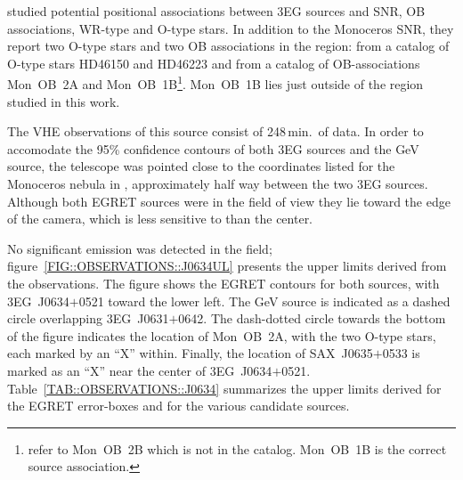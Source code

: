 \citet{REF::ROMERO::AA1999} studied potential positional associations
between 3EG sources and SNR, OB associations, WR-type and O-type
stars.  In addition to the Monoceros SNR, they report two O-type stars
and two OB associations in the region: from a catalog of O-type stars
\citep{REF::CRUZ-GONZALEZ::RMAA1974} HD46150 and HD46223 and
from a catalog of OB-associations \citep{REF::MELNIK::AL1995}
Mon~OB~2A and Mon~OB~1B\footnote{\citet{REF::ROMERO::AA1999} refer to
Mon~OB~2B which is not in the catalog. Mon~OB~1B is the correct source
association.}. Mon~OB~1B lies just outside of the region studied in
this work.

The VHE observations of this source consist of 248\,min.\ of data. In
order to accomodate the 95\% confidence contours of both 3EG sources
and the GeV source, the telescope was pointed close to the coordinates
listed for the Monoceros nebula in \citet{REF::GREEN::WEB2001},
approximately half way between the two 3EG sources. Although both
EGRET sources were in the field of view they lie toward the edge of
the camera, which is less sensitive to \Grays than the center.

No significant emission was detected in the field;
figure~\ref{FIG::OBSERVATIONS::J0634UL} presents the upper limits
derived from the observations. The figure shows the EGRET contours for
both sources, with 3EG~J0634$+$0521 toward the lower left. The GeV
source is indicated as a dashed circle overlapping 3EG~J0631$+$0642.
The dash-dotted circle towards the bottom of the figure indicates the
location of Mon~OB~2A, with the two O-type stars, each marked by an
``X'' within. Finally, the location of SAX~J0635$+$0533 is marked as
an ``X'' near the center of
3EG~J0634$+$0521. Table~\ref{TAB::OBSERVATIONS::J0634} summarizes the
upper limits derived for the EGRET error-boxes and for the various
candidate sources.

